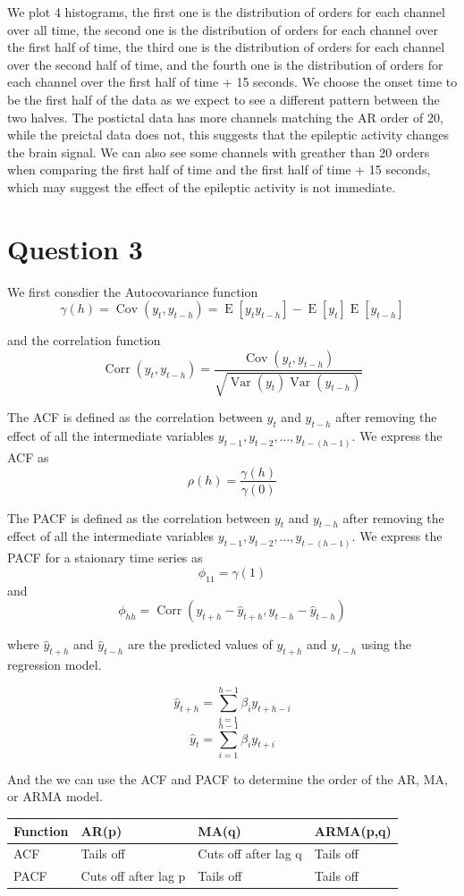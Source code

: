 \documentclass{article}
\DeclareMathOperator{\Cov}{Cov}
\DeclareMathOperator{\Corr}{Corr}
\DeclareMathOperator{\Var}{Var}
\DeclareMathOperator{\E}{E}
\begin{document}
We plot 4 histograms, the first one is the distribution of orders for each channel over all time, the second one is the distribution of orders for each channel over the first half of time, the third one is the distribution of orders for each channel over the second half of time, and the fourth one is the distribution of orders for each channel over the first half of time + 15 seconds.
We choose the onset time to be the first half of the data as we expect to see a different pattern between the two halves. The postictal data has more channels matching the AR order of 20, while the preictal data does not, this suggests that the epileptic activity changes the brain signal. We can also see some channels with greather than 20 orders when comparing the first half of time and the first half of time + 15 seconds, which may suggest the effect of the epileptic activity is not immediate.


\newpage
\section*{Question 3}
We first consdier the Autocovariance function
\[\gamma(h)  = \Cov(y_t, y_{t-h}) = \E[y_t y_{t-h}] - \E[y_t] \E[y_{t-h}]\]

and the correlation function
\[\Corr(y_t, y_{t-h}) = \frac{\Cov(y_t, y_{t-h})}{\sqrt{\Var(y_t) \Var(y_{t-h})}}\]

The ACF is defined as the correlation between $y_t$ and $y_{t-h}$ after removing the effect of all the intermediate variables $y_{t-1}, y_{t-2}, \ldots, y_{t-(h-1)}$. We express the ACF as
\[\rho(h) = \frac{\gamma(h)}{\gamma(0)}\]

The PACF is defined as the correlation between $y_t$ and $y_{t-h}$ after removing the effect of all the intermediate variables $y_{t-1}, y_{t-2}, \ldots, y_{t-(h-1)}$. We express the PACF for a staionary time series as
\[\phi_{11} = \gamma(1)\]
and 
\[\phi_{hh} = \Corr(y_{t+h} - \hat y_{t+h}, y_{t-h} - \hat y_{t-h})\]

where $\hat y_{t+h}$ and $\hat y_{t-h}$ are the predicted values of $y_{t+h}$ and $y_{t-h}$ using the regression model.

\[\hat y_{t+h} = \sum_{i=1}^{h-1} \beta_{i} y_{t + h - i }\]
\[\hat y_{t} = \sum_{i=1}^{h-1} \beta_{i} y_{t + i }\]

And the we can use the ACF and PACF to determine the order of the AR, MA, or ARMA model.
\begin{table}[!ht]
  \centering
  \begin{tabular}{|l|l|l|l|}
  \hline
      Function & AR(p) & MA(q) & ARMA(p,q) \\ \hline
      ACF & Tails off & Cuts off after lag q & Tails off \\ \hline
      PACF & Cuts off after lag p & Tails off & Tails off \\ \hline
  \end{tabular}
\end{table}
\end{document}
